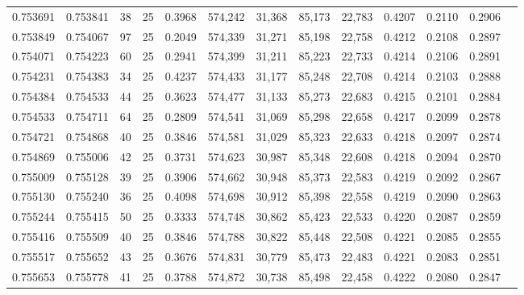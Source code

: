 \begin{tabular}{rrrrrrrrrrrrr}
0.753691 & 0.753841 &    38 &  25 &                                     0.3968 & 574,242 &  31,368 &  85,173 &  22,783 & 0.4207 & 0.2110 & 0.2906 \\
0.753849 & 0.754067 &    97 &  25 &                                     0.2049 & 574,339 &  31,271 &  85,198 &  22,758 & 0.4212 & 0.2108 & 0.2897 \\
0.754071 & 0.754223 &    60 &  25 &                                     0.2941 & 574,399 &  31,211 &  85,223 &  22,733 & 0.4214 & 0.2106 & 0.2891 \\
0.754231 & 0.754383 &    34 &  25 &                                     0.4237 & 574,433 &  31,177 &  85,248 &  22,708 & 0.4214 & 0.2103 & 0.2888 \\
0.754384 & 0.754533 &    44 &  25 &                                     0.3623 & 574,477 &  31,133 &  85,273 &  22,683 & 0.4215 & 0.2101 & 0.2884 \\
0.754533 & 0.754711 &    64 &  25 &                                     0.2809 & 574,541 &  31,069 &  85,298 &  22,658 & 0.4217 & 0.2099 & 0.2878 \\
0.754721 & 0.754868 &    40 &  25 &                                     0.3846 & 574,581 &  31,029 &  85,323 &  22,633 & 0.4218 & 0.2097 & 0.2874 \\
0.754869 & 0.755006 &    42 &  25 &                                     0.3731 & 574,623 &  30,987 &  85,348 &  22,608 & 0.4218 & 0.2094 & 0.2870 \\
0.755009 & 0.755128 &    39 &  25 &                                     0.3906 & 574,662 &  30,948 &  85,373 &  22,583 & 0.4219 & 0.2092 & 0.2867 \\
0.755130 & 0.755240 &    36 &  25 &                                     0.4098 & 574,698 &  30,912 &  85,398 &  22,558 & 0.4219 & 0.2090 & 0.2863 \\
0.755244 & 0.755415 &    50 &  25 &                                     0.3333 & 574,748 &  30,862 &  85,423 &  22,533 & 0.4220 & 0.2087 & 0.2859 \\
0.755416 & 0.755509 &    40 &  25 &                                     0.3846 & 574,788 &  30,822 &  85,448 &  22,508 & 0.4221 & 0.2085 & 0.2855 \\
0.755517 & 0.755652 &    43 &  25 &                                     0.3676 & 574,831 &  30,779 &  85,473 &  22,483 & 0.4221 & 0.2083 & 0.2851 \\
0.755653 & 0.755778 &    41 &  25 &                                     0.3788 & 574,872 &  30,738 &  85,498 &  22,458 & 0.4222 & 0.2080 & 0.2847 \\

\end{tabular}
